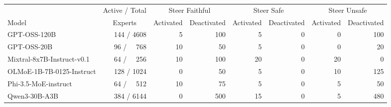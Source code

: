 \begin{table}[h]

\scriptsize
\centering

\begin{tabular}{l|r|rr|rr|rr}
\toprule
 & \multicolumn{1}{c|}{Active / Total} & \multicolumn{2}{c|}{Steer Faithful} & \multicolumn{2}{c|}{Steer Safe} & \multicolumn{2}{c}{Steer Unsafe} \\
 Model & \multicolumn{1}{c|}{Experts} & Activated & Deactivated & Activated & Deactivated & Activated & Deactivated \\
\midrule
GPT-OSS-120B & 144 / 4608 & 5 & 100 & 5 & 0 & 0 & 100 \\
GPT-OSS-20B & 96 /~~ 768 & 10 & 50 & 5 & 0 & 0 & 20 \\
Mixtral-8x7B-Instruct-v0.1 & 64 /~~ 256 & 10 & 100 & 20 & 0 & 20 & 0 \\
OLMoE-1B-7B-0125-Instruct & 128 / 1024 & 0 & 50 & 5 & 0 & 10 & 125 \\
Phi-3.5-MoE-instruct & 64 /~~ 512 & 10 & 75 & 5 & 0 & 5 & 50 \\
Qwen3-30B-A3B & 384 / 6144 & 0 & 500 & 15 & 0 & 5 & 480 \\
\bottomrule
\end{tabular}


    



\end{table}
